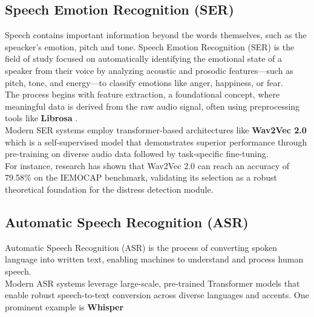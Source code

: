 \documentclass[12pt,a4paper,oneside,english]{book}
\begin{document}
{\subsection{Speech Emotion Recognition (SER)}%
\label{ser}
Speech contains important information beyond the words themselves, such as the speacker's emotion, pitch and tone.
Speech Emotion Recognition (SER) is the field of study focused on automatically identifying the emotional state of a speaker from their voice by analyzing acoustic and prosodic features—such as pitch, tone, and energy—to classify emotions like anger, happiness, or fear.
\\The process begins with feature extraction, a foundational concept, where meaningful data is derived from the raw audio signal, often using preprocessing  tools like \textbf{Librosa} \cite{librosa}.%
\\Modern SER systems employ transformer-based architectures like \textbf{Wav2Vec 2.0} \cite{NEURIPS2020_92d1e1ebWav2Vec} 
which is a self-supervised model that demonstrates superior performance through pre-training on diverse audio data followed by task-specific fine-tuning.
\\For instance, research has shown that Wav2Vec 2.0 can reach an accuracy of 79.58\% on the IEMOCAP benchmark\cite{wang2022finetunedwav2vec20hubertbenchmark},%
validating its selection as a robust theoretical foundation for the distress detection module.


\subsection{Automatic Speech Recognition (ASR)}%
\label{asr}

%
%
Automatic Speech Recognition (ASR) is the process of converting spoken language into written text, enabling machines to understand and process human speech.
\\Modern ASR systems leverage large-scale, pre-trained Transformer models that enable robust speech-to-text conversion across diverse languages and accents.
One prominent example is \textbf{Whisper} \cite{pmlr-v139-radford21aWhisper}
}
\end{document}
